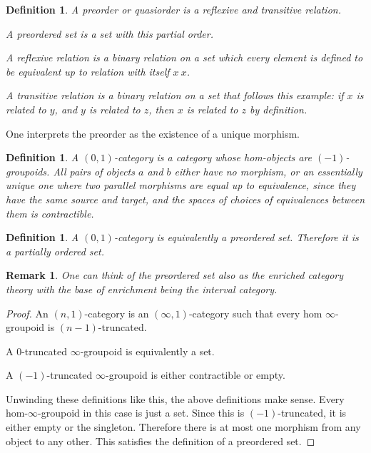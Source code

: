 \documentclass{tufte-book}
\newtheorem{definition}[theorem]{Definition}
\newtheorem{remark}[theorem]{Remark}
\begin{document}
 \begin{definition}
 	A preorder or quasiorder is a reflexive and transitive relation.
 
 	A preordered set is a set with this partial order.
 
 	A reflexive relation is a binary relation on a set which every element is defined to be equivalent up to relation with itself $x ~ x$.
 
 	A transitive relation is a binary relation on a set that follows this example: if $x$ is related to $y$, and $y$ is related to $z$, then $x$ is related to $z$ by definition.
 \end{definition}
 
 One interprets the preorder as the existence of a unique morphism.
 
 \begin{definition}
 	A $(0,1)$-category is a category whose hom-objects are $(-1)$-groupoids. All pairs of objects $a$ and $b$ either have no morphism, or an essentially unique one where two parallel morphisms are equal up to equivalence, since they have the same source and target, and the spaces of choices of equivalences between them is contractible.
 \end{definition}
 
 \begin{definition}
 	A $(0,1)$-category is equivalently a preordered set. Therefore it is a partially ordered set.
 \end{definition}
 
 \begin{remark}
 	One can think of the preordered set also as the enriched category theory with the base of enrichment being the interval category.
 \end{remark}
 
 \begin{proof}
 	An $(n,1)$-category is an $(\infty,1)$-category such that every hom $\infty$-groupoid is $(n-1)$-truncated.
 	
 	A $0$-truncated $\infty$-groupoid is equivalently a set.
 	
 	A $(-1)$-truncated $\infty$-groupoid is either contractible or empty.
 
 	Unwinding these definitions like this, the above definitions make sense. Every hom-$\infty$-groupoid in this case is just a set. Since this is $(-1)$-truncated, it is either empty or the singleton. Therefore there is at most one morphism from any object to any other. This satisfies the definition of a preordered set.
 \end{proof}
 
\end{document}
